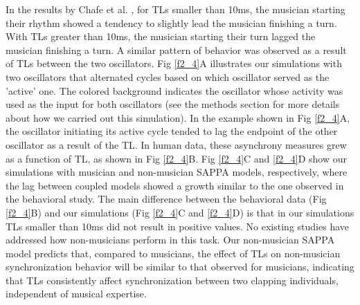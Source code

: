 \documentclass{report}
\begin{document}
In the results by Chafe et al. \cite{chafe2010effect}, for TLs smaller than 10ms, the musician starting their rhythm showed a tendency to slightly lead the musician finishing a turn. With TLs greater than 10ms, the musician starting their turn lagged the musician finishing a turn. A similar pattern of behavior was observed as a result of TLs between the two oscillators. Fig \ref{f2_4}A illustrates our simulations with two oscillators that alternated cycles based on which oscillator served as the 'active' one. The colored background indicates the oscillator whose activity was used as the input for both oscillators (see the methods section for more details about how we carried out this simulation). In the example shown in Fig \ref{f2_4}A, the oscillator initiating its active cycle tended to lag the endpoint of the other oscillator as a result of the TL. In human data, these asynchrony measures grew as a function of TL, as shown in Fig \ref{f2_4}B. Fig \ref{f2_4}C and \ref{f2_4}D show our simulations with musician and non-musician SAPPA models, respectively, where the lag between coupled models showed a growth similar to the one observed in the behavioral study. The main difference between the behavioral data (Fig \ref{f2_4}B) and our simulations (Fig \ref{f2_4}C and \ref{f2_4}D) is that in our simulations TLs smaller than 10ms did not result in positive values. No existing studies have addressed how non-musicians perform in this task. Our non-musician SAPPA model predicts that, compared to musicians, the effect of TLs on non-musician synchronization behavior will be similar to that observed for musicians, indicating that TLs consistently affect synchronization between two clapping individuals, independent of musical expertise.
\end{document}
